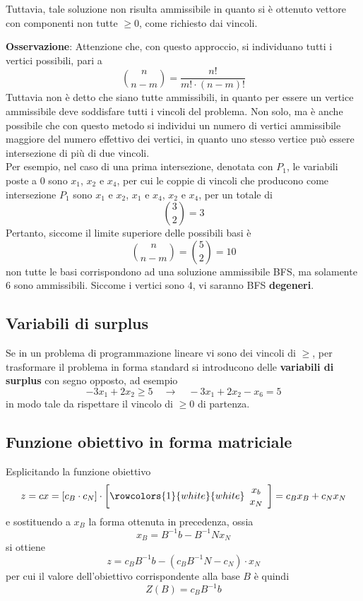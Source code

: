 \documentclass[a4paper]{extarticle}
\begin{document}
Tuttavia, tale soluzione non risulta ammissibile in quanto si è ottenuto vettore con componenti non tutte $\geq 0$, come richiesto dai vincoli.

\vspace{1em}
\noindent
\textbf{Osservazione}: Attenzione che, con questo approccio, si individuano tutti i vertici possibili, pari a
\[\binom{n}{n-m} = \frac{n!}{m! \cdot (n-m)!}\]
Tuttavia non è detto che siano tutte ammissibili, in quanto per essere un vertice ammissibile deve soddisfare tutti i vincoli del problema. Non solo, ma è anche possibile che con questo metodo si individui un numero di vertici ammissibile maggiore del numero effettivo dei vertici, in quanto uno stesso vertice può essere intersezione di più di due vincoli.\\
Per esempio, nel caso di una prima intersezione, denotata con $P_1$, le variabili poste a $0$ sono $x_1$, $x_2$ e $x_4$, per cui le coppie di vincoli che producono come intersezione $P_1$ sono $x_1$ e $x_2$, $x_1$ e $x_4$, $x_2$ e $x_4$, per un totale di
\[\binom{3}{2}=3\]
Pertanto, siccome il limite superiore delle possibili basi è
\[\binom{n}{n-m} = \binom{5}{2} = 10\]
non tutte le basi corrispondono ad una soluzione ammissibile BFS, ma solamente $6$ sono ammissibili. Siccome i vertici sono $4$, vi saranno BFS \textbf{degeneri}.

\vspace{1em}
\subsection{Variabili di surplus}
Se in un problema di programmazione lineare vi sono dei vincoli di $\geq$, per trasformare il problema in forma standard si introducono delle \textbf{variabili di surplus} con segno opposto, ad esempio
\[-3x_1 + 2x_2 \geq 5 \hspace{1em} \rightarrow \hspace{1em} -3x_1 + 2x_2 - x_6 = 5\]
in modo tale da rispettare il vincolo di $\geq 0$ di partenza.

\vspace{1em}
\subsection{Funzione obiettivo in forma matriciale}
Esplicitando la funzione obiettivo
\[z = c x = \left[c_B \cdot c_N\right] \cdot \left[
\rowcolors{1}{white}{white}
\begin{array}{c}
    x_b\\
    x_N
\end{array}
\right] = c_B x_B + c_N x_N 
\]
e sostituendo a $x_B$ la forma ottenuta in precedenza, ossia
\[x_B = B^{-1} b - B^{-1} N x_N\]
si ottiene
\[z=c_B B^{-1}b - \left(c_B B^{-1}N - c_N\right) \cdot x_N\]
per cui il valore dell'obiettivo corrispondente alla base $B$ è quindi
\[\boxed{Z(B) = c_B B^{-1} b}\]
\end{document}

